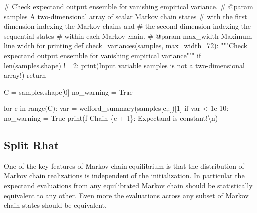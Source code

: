 \documentclass[
  letterpaper,
  DIV=11,
  numbers=noendperiod]{scrartcl}
\newenvironment{Shaded}{\begin{snugshade}}{\end{snugshade}}
\newcommand{\BuiltInTok}[1]{\textcolor[rgb]{0.00,0.23,0.31}{#1}}
\newcommand{\CharTok}[1]{\textcolor[rgb]{0.13,0.47,0.30}{#1}}
\newcommand{\CommentTok}[1]{\textcolor[rgb]{0.37,0.37,0.37}{#1}}
\newcommand{\ControlFlowTok}[1]{\textcolor[rgb]{0.00,0.23,0.31}{#1}}
\newcommand{\DecValTok}[1]{\textcolor[rgb]{0.68,0.00,0.00}{#1}}
\newcommand{\FloatTok}[1]{\textcolor[rgb]{0.68,0.00,0.00}{#1}}
\newcommand{\KeywordTok}[1]{\textcolor[rgb]{0.00,0.23,0.31}{#1}}
\newcommand{\NormalTok}[1]{\textcolor[rgb]{0.00,0.23,0.31}{#1}}
\newcommand{\OperatorTok}[1]{\textcolor[rgb]{0.37,0.37,0.37}{#1}}
\newcommand{\SpecialCharTok}[1]{\textcolor[rgb]{0.37,0.37,0.37}{#1}}
\newcommand{\SpecialStringTok}[1]{\textcolor[rgb]{0.13,0.47,0.30}{#1}}
\newcommand{\StringTok}[1]{\textcolor[rgb]{0.13,0.47,0.30}{#1}}
\newcommand{\VariableTok}[1]{\textcolor[rgb]{0.07,0.07,0.07}{#1}}
\begin{document}
\begin{Shaded}
\begin{Highlighting}[]
\CommentTok{\# Check expectand output ensemble for vanishing empirical variance.}
\CommentTok{\# @param samples A two{-}dimensional array of scalar Markov chain states}
\CommentTok{\#                with the first dimension indexing the Markov chains and}
\CommentTok{\#                the second dimension indexing the sequential states}
\CommentTok{\#                within each Markov chain.}
\CommentTok{\# @param max\_width Maximum line width for printing}
\KeywordTok{def}\NormalTok{ check\_variances(samples, max\_width}\OperatorTok{=}\DecValTok{72}\NormalTok{):}
  \CommentTok{"""Check expectand output ensemble for vanishing empirical variance"""}
  \ControlFlowTok{if} \BuiltInTok{len}\NormalTok{(samples.shape) }\OperatorTok{!=} \DecValTok{2}\NormalTok{:}
    \BuiltInTok{print}\NormalTok{(}\StringTok{\textquotesingle{}Input variable \textasciigrave{}samples\textasciigrave{} is not a two{-}dimensional array!\textquotesingle{}}\NormalTok{)}
    \ControlFlowTok{return}
  
\NormalTok{  C }\OperatorTok{=}\NormalTok{ samples.shape[}\DecValTok{0}\NormalTok{]}
\NormalTok{  no\_warning }\OperatorTok{=} \VariableTok{True}
  
  \ControlFlowTok{for}\NormalTok{ c }\KeywordTok{in} \BuiltInTok{range}\NormalTok{(C):}
\NormalTok{    var }\OperatorTok{=}\NormalTok{ welford\_summary(samples[c,:])[}\DecValTok{1}\NormalTok{]}
    \ControlFlowTok{if}\NormalTok{ var }\OperatorTok{\textless{}} \FloatTok{1e{-}10}\NormalTok{:}
\NormalTok{      no\_warning }\OperatorTok{=} \VariableTok{True}
      \BuiltInTok{print}\NormalTok{(}\SpecialStringTok{f\textquotesingle{}  Chain }\SpecialCharTok{\{}\NormalTok{c }\OperatorTok{+} \DecValTok{1}\SpecialCharTok{\}}\SpecialStringTok{: Expectand is constant!}\CharTok{\textbackslash{}n}\SpecialStringTok{\textquotesingle{}}\NormalTok{)}
\end{Highlighting}
\end{Shaded}

\subsection{Split Rhat}\label{split-rhat}

One of the key features of Markov chain equilibrium is that the
distribution of Markov chain realizations is independent of the
initialization. In particular the expectand evaluations from any
equilibrated Markov chain should be statistically equivalent to any
other. Even more the evaluations across any subset of Markov chain
states should be equivalent.
\end{document}
